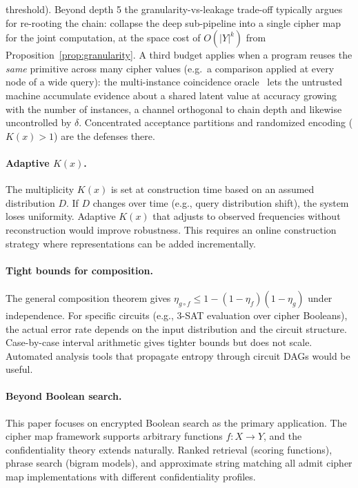 \documentclass[conference]{IEEEtran}
\theoremstyle{definition}
\theoremstyle{plain}
\theoremstyle{remark}
\begin{document}
threshold).  Beyond depth 5 the granularity-vs-leakage trade-off
typically argues for re-rooting the chain: collapse the deep
sub-pipeline into a single cipher map for the joint computation, at
the space cost of $O(|Y|^k)$ from Proposition~\ref{prop:granularity}.
A third budget applies when a program reuses the \emph{same}
primitive across many cipher values (e.g.\ a comparison applied at
every node of a wide query): the multi-instance coincidence
oracle~\cite[Thm.~8.2]{towell2026cipher} lets the untrusted machine
accumulate evidence about a shared latent value at accuracy growing
with the number of instances, a channel orthogonal to chain depth and
likewise uncontrolled by $\delta$.  Concentrated acceptance partitions
and randomized encoding ($K(x) > 1$) are the defenses there.

\paragraph{Adaptive $K(x)$.}
The multiplicity $K(x)$ is set at construction time based on an assumed
distribution $D$.  If $D$ changes over time (e.g., query distribution
shift), the system loses uniformity.  Adaptive $K(x)$ that adjusts to
observed frequencies without reconstruction would improve robustness.
This requires an online construction strategy where representations can
be added incrementally.

\paragraph{Tight bounds for composition.}
The general composition theorem gives
$\eta_{g \circ f} \leq 1 - (1 - \eta_f)(1 - \eta_g)$ under
independence.  For specific circuits (e.g., 3-SAT evaluation over cipher
Booleans), the actual error rate depends on the input distribution and
the circuit structure.  Case-by-case interval arithmetic gives tighter
bounds but does not scale.  Automated analysis tools that propagate
entropy through circuit DAGs would be useful.

\paragraph{Beyond Boolean search.}
This paper focuses on encrypted Boolean search as the primary
application.  The cipher map framework supports arbitrary functions
$f : X \to Y$, and the confidentiality theory extends naturally.  Ranked
retrieval (scoring functions), phrase search (bigram models), and
approximate string matching all admit cipher map implementations with
different confidentiality profiles.
\end{document}
